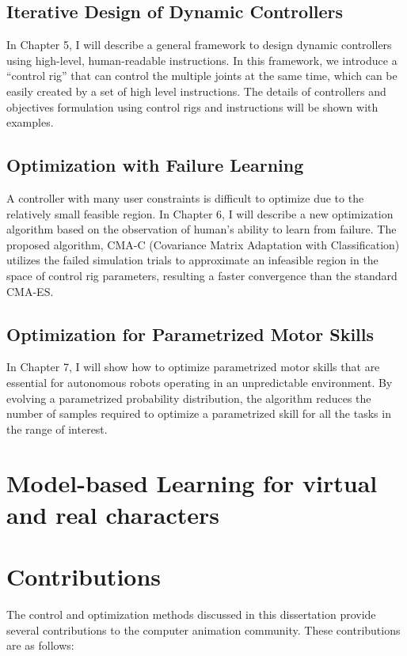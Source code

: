 \subsection{Iterative Design of Dynamic Controllers}
In Chapter 5, I will describe a general framework to design dynamic
controllers using high-level, human-readable instructions.
In this framework, we introduce a “control rig” that can control the multiple
joints at the same time, which can be easily created by a set of high level
instructions.
The details of controllers and objectives formulation using control rigs and
instructions will be shown with examples.

\subsection{Optimization with Failure Learning}
A controller with many user constraints is difficult to optimize due to the
relatively small feasible region.
In Chapter 6, I will describe a new optimization algorithm based on the
observation of human’s ability to learn from failure.
The proposed algorithm, CMA-C (Covariance Matrix Adaptation with
Classification) utilizes the failed simulation trials to approximate 
an infeasible region in the space of control rig parameters, resulting a
faster convergence than the standard CMA-ES.

\subsection{Optimization for Parametrized Motor Skills}
In Chapter 7, I will show how to optimize parametrized motor skills that are
essential for autonomous robots operating in an unpredictable environment. 
By evolving a parametrized probability distribution, the algorithm reduces 
the number of samples required to optimize a parametrized skill for 
all the tasks in the range of interest. 

\section{Model-based Learning for virtual and real characters}

\section{Contributions}
The control and optimization methods discussed in this dissertation provide
several contributions to the computer animation community. 
These contributions are as follows:



